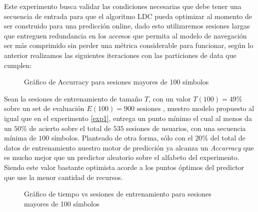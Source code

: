 Este experimento busca validar las condiciones necesarias que debe tener una secuencia de entrada para que el algoritmo LDC pueda optimizar al momento de ser construido para una predicción online, dado esto utilizaremos sesiones largas que entreguen redundancia en los accesos que permita al modelo de navegación ser más comprimido sin perder una métrica considerable para funcionar, según lo anterior realizamos las siguientes iteraciones con las particiones de data que cumplen: 
	
	\begin{figure}[h] 
		\centering
		\caption{Gráfico de Accurracy para sesiones mayores de 100 símbolos}
		\label{fig:sim}
	\end{figure}
	
	
	Sean la sesiones de entrenamiento de tamaño $T$, con un valor  $T(100) = 49 \% $ sobre un set de evaluación $E(100) = 900 \mbox{ sesiones}$ , nuestro modelo propuesto al igual que en el experimento \ref{exp1}, entrega un punto mínimo el cual al menos da un $50\%$ de acierto sobre el total de $535$ sesiones de usuarios, con una secuencia mínima de $100$ símbolos. Planteado de otra forma, sólo con el $20\%$ del total de datos de entrenamiento nuestro motor de predicción ya alcanza un \emph{Accurracy} que es mucho mejor que un predictor aleatorio sobre el alfabeto del experimento. Siendo este valor bastante optimista acorde a los puntos óptimos del predictor que use la menor cantidad de recursos.
	
	
	\begin{figure}[h] 
	\centering
		\caption{Gráfico de tiempo vs sesiones de entrenamiento para sesiones mayores de 100 símbolos}
		\label{fig:sim}
	\end{figure}

